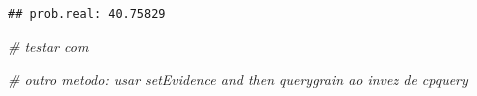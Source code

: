 \documentclass[
]{article}
\newenvironment{Shaded}{\begin{snugshade}}{\end{snugshade}}
\newcommand{\CommentTok}[1]{\textcolor[rgb]{0.56,0.35,0.01}{\textit{#1}}}
\begin{document}
\begin{verbatim}
## prob.real: 40.75829
\end{verbatim}

\begin{Shaded}
\begin{Highlighting}[]
\CommentTok{\# testar com }
\end{Highlighting}
\end{Shaded}

\begin{Shaded}
\begin{Highlighting}[]
\CommentTok{\# outro metodo: usar setEvidence and then querygrain ao invez de cpquery}
\end{Highlighting}
\end{Shaded}
\end{document}
